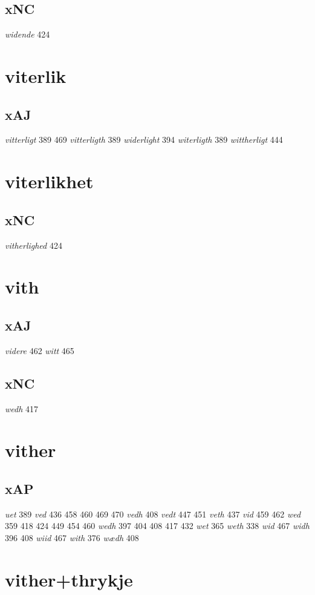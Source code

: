 \documentclass[a4paper,twocolumn]{article}
\begin{document}
\subsection{xNC}
\label{sec:org4c99062}
\emph{widende} 424 
\section{viterlik}
\label{sec:orgb03922b}
\subsection{xAJ}
\label{sec:orgebb6db5}
\emph{vitterligt} 389 469 \emph{vitterligth} 389 \emph{widerlight} 394 \emph{witerligth} 389 \emph{wittherligt} 444 
\section{viterlikhet}
\label{sec:orgbd1a3b9}
\subsection{xNC}
\label{sec:org2584051}
\emph{vitherlighed} 424 
\section{vith}
\label{sec:orgd7b8d3f}
\subsection{xAJ}
\label{sec:org2e7c4e7}
\emph{videre} 462 \emph{witt} 465 
\subsection{xNC}
\label{sec:orgc50f3a6}
\emph{wedh} 417 
\section{vither}
\label{sec:org3d42cec}
\subsection{xAP}
\label{sec:org18da792}
\emph{uet} 389 \emph{ved} 436 458 460 469 470 \emph{vedh} 408 \emph{vedt} 447 451 \emph{veth} 437 \emph{vid} 459 462 \emph{wed} 359 418 424 449 454 460 \emph{wedh} 397 404 408 417 432 \emph{wet} 365 \emph{weth} 338 \emph{wid} 467 \emph{widh} 396 408 \emph{wiid} 467 \emph{with} 376 \emph{wædh} 408 
\section{vither+thrykje}
\label{sec:orgac61460}
\end{document}
